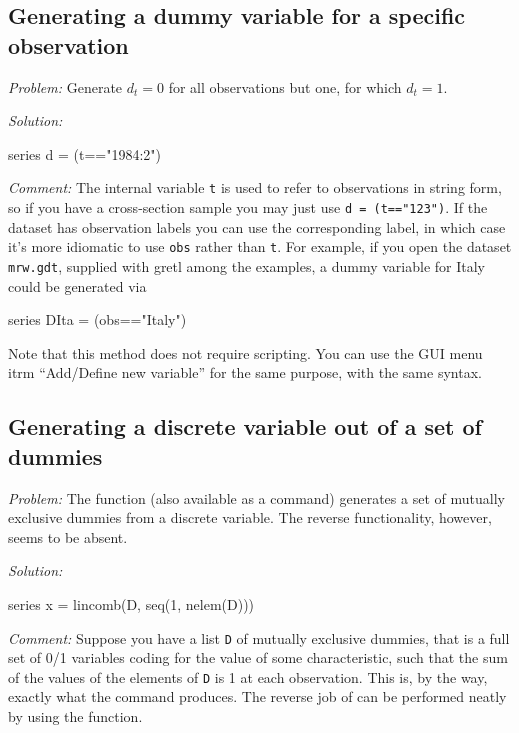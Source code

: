 \subsection{Generating a dummy variable for a specific observation}

\emph{Problem:} Generate $d_t = 0$ for all observations but one, for
which $d_t = 1$.

\emph{Solution:}
\begin{code}
  series d = (t=="1984:2")
\end{code}

\emph{Comment:} The internal variable \texttt{t} is used to refer to
observations in string form, so if you have a cross-section sample you
may just use \texttt{d = (t=="123")}. If the dataset has observation
labels you can use the corresponding label, in which case it's more
idiomatic to use \texttt{obs} rather than \texttt{t}. For example, if
you open the dataset \texttt{mrw.gdt}, supplied with gretl among the
examples, a dummy variable for Italy could be generated via
\begin{code}
  series DIta = (obs=="Italy")
\end{code}

Note that this method does not require scripting. You can use the GUI
menu itrm ``Add/Define new variable'' for the same purpose, with the
same syntax.

\subsection{Generating a discrete variable out of a set of dummies}

\emph{Problem:} The  function (also available as a
command) generates a set of mutually exclusive dummies from a discrete
variable. The reverse functionality, however, seems to be absent.

\emph{Solution:}
\begin{code}
series x = lincomb(D, seq(1, nelem(D)))
\end{code}

\emph{Comment:} Suppose you have a list \texttt{D} of mutually
exclusive dummies, that is a full set of 0/1 variables coding for the
value of some characteristic, such that the sum of the values of the
elements of \texttt{D} is 1 at each observation. This is, by the way,
exactly what the  command produces.  The reverse job of
 can be performed neatly by using the 
function.

